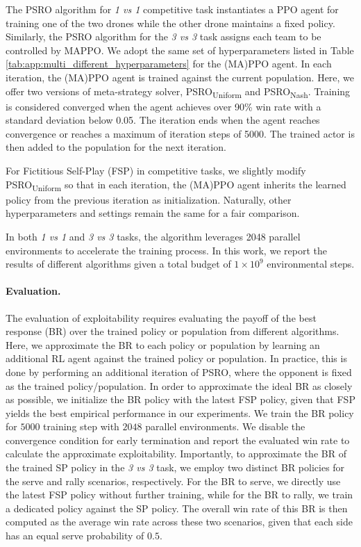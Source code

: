The PSRO algorithm for \textit{1 vs 1} competitive task instantiates a PPO agent for training one of the two drones while the other drone maintains a fixed policy. Similarly, the PSRO algorithm for the \textit{3 vs 3} task assigns each team to be controlled by MAPPO. We adopt the same set of hyperparameters listed in Table \ref{tab:app:multi_different_hyperparameters} for the (MA)PPO agent. In each iteration, the (MA)PPO agent is trained against the current population. Here, we offer two versions of meta-strategy solver, PSRO\textsubscript{Uniform} and PSRO\textsubscript{Nash}. Training is considered converged when the agent achieves over 90\% win rate with a standard deviation below 0.05. The iteration ends when the agent reaches convergence or reaches a maximum of iteration steps of 5000. The trained actor is then added to the population for the next iteration. 

For Fictitious Self-Play (FSP) in competitive tasks, we slightly modify PSRO\textsubscript{Uniform} so that in each iteration, the (MA)PPO agent inherits the learned policy from the previous iteration as initialization. Naturally, other hyperparameters and settings remain the same for a fair comparison.

In both \textit{1 vs 1} and \textit{3 vs 3} tasks, the algorithm leverages 2048 parallel environments to accelerate the training process. In this work, we report the results of different algorithms given a total budget of $1\times 10^{9}$ environmental steps.

\paragraph{Evaluation.}
The evaluation of exploitability requires evaluating the payoff of the best response (BR) over the trained policy or population from different algorithms. Here, we approximate the BR to each policy or population by learning an additional RL agent against the trained policy or population. In practice, this is done by performing an additional iteration of PSRO, where the opponent is fixed as the trained policy/population. In order to approximate the ideal BR as closely as possible, we initialize the BR policy with the latest FSP policy, given that FSP yields the best empirical performance in our experiments. We train the BR policy for $5000$ training step with $2048$ parallel environments. We disable the convergence condition for early termination and report the evaluated win rate to calculate the approximate exploitability. Importantly, to approximate the BR of the trained SP policy in the \textit{3 vs 3} task, we employ two distinct BR policies for the serve and rally scenarios, respectively. For the BR to serve, we directly use the latest FSP policy without further training, while for the BR to rally, we train a dedicated policy against the SP policy. The overall win rate of this BR is then computed as the average win rate across these two scenarios, given that each side has an equal serve probability of $0.5$.


